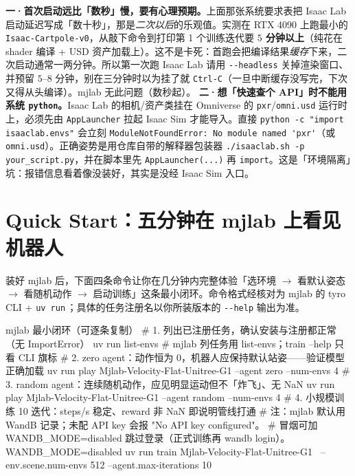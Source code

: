 \begin{pitfall}
\textbf{一·首次启动远比「数秒」慢，要有心理预期。}上面那张系统要求表把 Isaac Lab 启动延迟写成「数十秒」，那是\emph{二次以后}的乐观值。实测在 RTX 4090 上跑最小的 \verb|Isaac-Cartpole-v0|，从敲下命令到打印第 1 个训练迭代要 \textbf{$5$ 分钟以上}（纯花在 shader 编译 + USD 资产加载上）。这不是卡死：首跑会把编译结果\emph{缓存}下来，二次启动通常一两分钟。所以第一次跑 Isaac Lab 请用 \verb|--headless| 关掉渲染窗口、并预留 $5$--$8$ 分钟，别在三分钟时以为挂了就 \verb|Ctrl-C|（一旦中断缓存没写完，下次又得从头编译）。mjlab 无此问题（数秒起）。
\textbf{二·想「快速查个 API」时不能用系统 \texttt{python}。}Isaac Lab 的相机/资产类挂在 Omniverse 的 \verb|pxr|/\verb|omni.usd| 运行时上，必须先由 \verb|AppLauncher| 拉起 Isaac Sim 才能导入。直接 \verb|python -c "import isaaclab.envs"| 会立刻 \verb|ModuleNotFoundError: No module named 'pxr'|（或 \verb|omni.usd|）。正确姿势是用仓库自带的解释器包装器 \verb|./isaaclab.sh -p your_script.py|，并在脚本里先 \verb|AppLauncher(...)| 再 \verb|import|。这是「环境隔离」坑：报错信息看着像没装好，其实是没经 Isaac Sim 入口。
\end{pitfall}

\section*{Quick Start：五分钟在 mjlab 上看见机器人}
\label{sec:rlmc-eco-quickstart}

装好 mjlab 后，下面四条命令让你在几分钟内完整体验「选环境 $\to$ 看默认姿态 $\to$ 看随机动作 $\to$ 启动训练」这条最小闭环。命令格式经核对为 mjlab 的 tyro CLI + \verb|uv run|\,\cite{mjlab2026}；具体的任务注册名以你所装版本的 \verb|--help| 输出为准。

\begin{codebox}[bash]{mjlab 最小闭环（可逐条复制）}
# 1. 列出已注册任务，确认安装与注册都正常（无 ImportError）
uv run list-envs        # mjlab 列任务用 list-envs；train --help 只看 CLI 旗标
# 2. zero agent：动作恒为 0，机器人应保持默认站姿——验证模型正确加载
uv run play Mjlab-Velocity-Flat-Unitree-G1 --agent zero --num-envs 4
# 3. random agent：连续随机动作，应见明显运动但不「炸飞」、无 NaN
uv run play Mjlab-Velocity-Flat-Unitree-G1 --agent random --num-envs 4
# 4. 小规模训练 10 迭代：steps/s 稳定、reward 非 NaN 即说明管线打通
#    注：mjlab 默认用 WandB 记录；未配 API key 会报 "No API key configured"。
#    冒烟可加 WANDB_MODE=disabled 跳过登录（正式训练再 wandb login）。
WANDB_MODE=disabled uv run train Mjlab-Velocity-Flat-Unitree-G1 \
    --env.scene.num-envs 512 --agent.max-iterations 10
\end{codebox}

